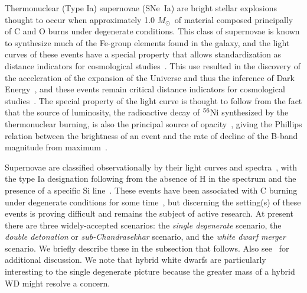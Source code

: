\documentclass[preprint2]{aastex63}
\newcommand{\SNeIa}{SNe~Ia}
\newcommand{\Ni}[1]{\ensuremath{{}^{#1}{\rm Ni}}}
\newcommand{\Msun}{\ensuremath{M_\odot}}
\begin{document}
Thermonuclear (Type Ia) supernovae (\SNeIa) are bright stellar explosions
thought to occur when approximately 1.0 \Msun\ of material composed principally
of C and O burns under degenerate conditions. This class of supernovae is
known to synthesize much of the Fe-group elements found in the galaxy, and
the light curves of these events have a special property that allows
standardization
as distance indicators for cosmological studies~\citep{phillips:absolute}.
This use resulted in the discovery of the acceleration of the expansion of
the Universe and thus the inference of Dark
Energy~\citep{riess.filippenko.ea:observational,
perlmutter.aldering.ea:measurements,leibundgut2001}, and these events
remain critical distance indicators for cosmological studies~\citep{weinbergetal2013}.
The special property of the light curve is thought to follow
from the fact that the source of luminosity, the radioactive decay
of \Ni{56} synthesized by the thermonuclear burning, is also the
principal source of opacity~\citep{Pinto2001The-type-Ia-sup}, giving
the Phillips relation between the brightness of an event and the
rate of decline of the B-band magnitude from maximum~\citep{phillips:absolute}.

Supernovae are classified observationally
by their light curves and spectra~\citep{minkowski41,bertola64,porterfilippenko87,
wheelerharkness1990conf,Fili97}, with the type Ia designation following from
the absence of H in the spectrum and the presence of a specific Si
line~\citep{filippenko:optical,hillebrandt.niemeyer:type}. These events
have been associated with C burning under degenerate conditions
for some time~\citep{hoylefowler60,arnett.truran.ea:nucleosynthesis},
but discerning the setting(s) of these events is proving difficult
and remains the subject of active research. At present there are three
widely-accepted scenarios: the {\em single degenerate} scenario,
the {\em double detonation} or {\em sub-Chandrasekhar} scenario, and
the {\em white dwarf merger} scenario.
We briefly describe these in the subsection that follows.
Also see~\citet{hillebrandt.niemeyer:type,howell2011,hillebrandtetal2013,calderetal2013,SeitenzahlTownsley2017,roepkesim2018}
for additional discussion. We note that hybrid white dwarfs are particularly 
interesting to the single degenerate picture because the greater mass of a hybrid WD might resolve a
concern.
\end{document}
